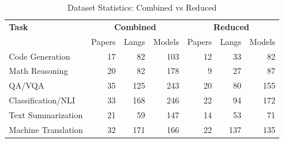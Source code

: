 \begin{table}[htbp]
\centering
\caption{Dataset Statistics: Combined vs Reduced}
\label{tab:dataset_stats}
\begin{tabular}{lrrrrrr}
\hline
\textbf{Task} & \multicolumn{3}{c}{\textbf{Combined}} & \multicolumn{3}{c}{\textbf{Reduced}} \\
 & Papers & Langs & Models & Papers & Langs & Models \\
\hline
Code Generation & 17 & 82 & 103 & 12 & 33 & 82 \\
Math Reasoning & 20 & 82 & 178 & 9 & 27 & 87 \\
QA/VQA & 35 & 125 & 243 & 20 & 80 & 155 \\
Classification/NLI & 33 & 168 & 246 & 22 & 94 & 172 \\
Text Summarization & 21 & 59 & 147 & 14 & 53 & 71 \\
Machine Translation & 32 & 171 & 166 & 22 & 137 & 135 \\
\hline
\end{tabular}
\end{table}